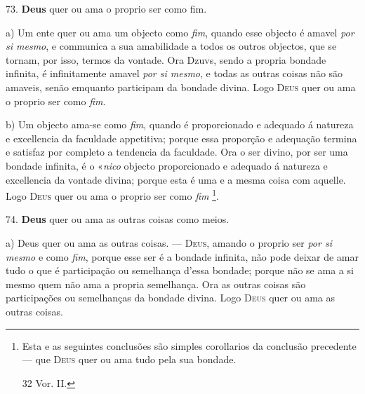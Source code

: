  73. \textbf{Deus} quer ou ama o proprio ser como fim.

a) Um ente quer ou ama um objecto como \emph{fim}, quando esse objecto é amavel \emph{por si mesmo}, e communica a sua amabilidade a todos os outros objectos, que se tornam, por isso, termos da vontade. Ora Dzuvs, sendo a propria bondade infinita, é infinitamente amavel \emph{por si mesmo}, e todas as outras coisas não são amaveis, senão emquanto participam da bondade divina. Logo \textsc{Deus} quer ou ama o proprio ser como \emph{fim}.

b) Um objecto ama-se como \emph{fim}, quando é proporcionado e adequado á natureza e excellencia da faculdade appetitiva; porque essa proporção e adequação termina e satisfaz por completo a tendencia da faculdade. Ora o ser divino, por ser uma bondade infinita, é o «\emph{nico} objecto proporcionado e adequado á natureza e excellencia da vontade divina; porque esta é uma e a mesma coisa com aquelle. Logo \textsc{Deus} quer ou ama o proprio ser como \emph{fim} \footnote{Esta e as seguintes conclusões são simples corollarios da conclusão precedente --- que \textsc{Deus} quer ou ama tudo pela sua bondade.\par 32 Vor. II.}.

74. \textbf{Deus} quer ou ama as outras coisas como meios.

a) Deus quer ou ama as outras coisas. --- \textsc{Deus}, amando o proprio ser \emph{por si mesmo} e como \emph{fim}, porque esse ser é a bondade infinita, não pode deixar de amar tudo o que é participação ou semelhança d'essa bondade; porque não se ama a si mesmo quem não ama a propria semelhança. Ora as outras coisas são participações ou semelhanças da bondade divina. Logo \textsc{Deus} quer ou ama as outras coisas.

